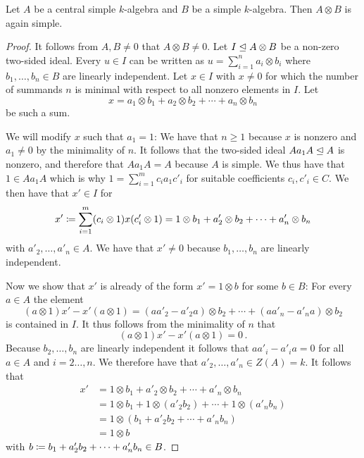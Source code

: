 \begin{lemma}
  \label{lemma: tensor product is again simple}
  Let $A$ be a central simple $k$-algebra and $B$ be a simple $k$-algebra.
  Then $A \otimes B$ is again simple.
\end{lemma}


\begin{proof}
  It follows from $A, B \neq 0$ that $A \otimes B \neq 0$.
  Let $I \trianglelefteq A \otimes B$ be a non-zero two-sided ideal.
  Every $u \in I$ can be written as $u = \sum_{i=1}^n a_i \otimes b_i$ where $b_1, \dotsc, b_n \in B$ are linearly independent.
  Let $x \in I$ with $x \neq 0$ for which the number of summands $n$ is minimal with respect to all nonzero elements in $I$.
  Let
  \begin{equation}
    \label{eqn: u as a sum}
      x
    = a_1 \otimes b_1 + a_2 \otimes b_2 + \dotsb + a_n \otimes b_n
  \end{equation}
  be such a sum.
  
  We will modify $x$ such that $a_1 = 1$:
  We have that $n \geq 1$ because $x$ is nonzero and $a_1 \neq 0$ by the minimality of $n$.
  It follows that the two-sided ideal $A a_1 A \trianglelefteq A$ is nonzero, and therefore that $A a_1 A = A$ because $A$ is simple.
  We thus have that $1 \in A a_1 A$ which is why $1 = \sum_{i=1}^m c_i a_1 c'_i$ for suitable coefficients $c_i, c'_i \in C$.
  We then have that $x' \in I$ for
  \[
              x'
    \coloneqq  \sum_{i=1}^m (c_i \otimes 1) x (c'_i \otimes 1)
    =         1 \otimes b_1 + a'_2 \otimes b_2 + \dotsb + a'_n \otimes b_n
  \]
  with $a'_2, \dotsc, a'_n \in A$.
  We have that $x' \neq 0$ because $b_1, \dotsc, b_n$ are linearly independent.
  
  Now we show that $x'$ is already of the form $x' = 1 \otimes b$ for some $b \in B$:
  For every $a \in A$ the element
  \[
        (a \otimes 1) x' - x' (a \otimes 1)
    =     (a a'_2 - a'_2 a) \otimes b_2
        + \dotsb
        + (a a'_n - a'_n a) \otimes b_2
  \]
  is contained in $I$.
  It thus follows from the minimality of $n$ that
  \[
      (a \otimes 1) x' - x' (a \otimes 1)
    = 0 \,.
  \]
  Because $b_2, \dotsc, b_n$ are linearly independent it follows that $a a'_i - a'_i a = 0$ for all $a \in A$ and $i = 2 \dotsc, n$.
  We therefore have that $a'_2, \dotsc, a'_n \in Z(A) = k$.
  It follows that
  \begin{align*}
        x'
    &=  1 \otimes b_1 + a'_2 \otimes b_2 + \dotsb + a'_n \otimes b_n  \\
    &=  1 \otimes b_1 + 1 \otimes (a'_2 b_2) + \dotsb + 1 \otimes (a'_n b_n)  \\
    &=  1 \otimes (b_1 + a'_2 b_2 + \dotsb + a'_n b_n)  \\
    &=  1 \otimes b
  \end{align*}
  with $b \coloneqq b_1 + a'_2 b_2 + \dotsb + a'_n b_n \in B$.
  

\end{proof}
